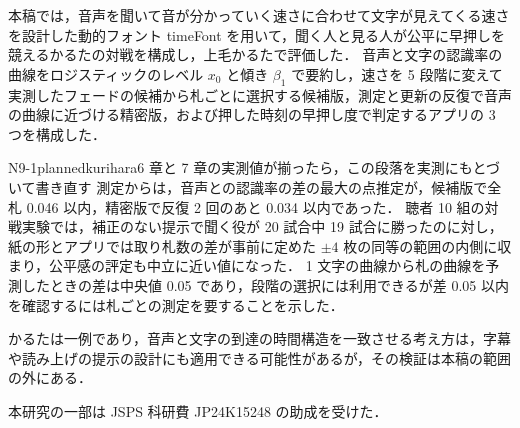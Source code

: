 本稿では，音声を聞いて音が分かっていく速さに合わせて文字が見えてくる速さを設計した動的フォント timeFont を用いて，聞く人と見る人が公平に早押しを競えるかるたの対戦を構成し，上毛かるたで評価した．
音声と文字の認識率の曲線をロジスティックのレベル $x_0$ と傾き $\beta_1$ で要約し，速さを 5 段階に変えて実測したフェードの候補から札ごとに選択する候補版，測定と更新の反復で音声の曲線に近づける精密版，および押した時刻の早押し度で判定するアプリの 3 つを構成した．
\begin{fd}{N9-1}{planned}{kurihara}{6 章と 7 章の実測値が揃ったら，この段落を実測にもとづいて書き直す}
測定からは，音声との認識率の差の最大の点推定が，候補版で全札 0.046 以内，精密版で反復 2 回のあと 0.034 以内であった．
聴者 10 組の対戦実験では，補正のない提示で聞く役が 20 試合中 19 試合に勝ったのに対し，紙の形とアプリでは取り札数の差が事前に定めた $\pm 4$ 枚の同等の範囲の内側に収まり，公平感の評定も中立に近い値になった．
1 文字の曲線から札の曲線を予測したときの差は中央値 0.05 であり，段階の選択には利用できるが差 0.05 以内を確認するには札ごとの測定を要することを示した．
\end{fd}
かるたは一例であり，音声と文字の到達の時間構造を一致させる考え方は，字幕や読み上げの提示の設計にも適用できる可能性があるが，その検証は本稿の範囲の外にある．

\begin{acknowledgment}
本研究の一部は JSPS 科研費 JP24K15248 の助成を受けた．
\end{acknowledgment}

